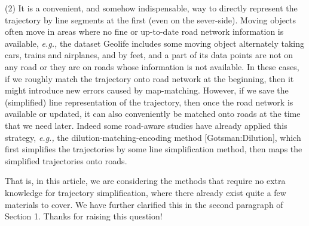 \documentclass{letter}
\newcommand{\eg}{\emph{e.g.,}\xspace}
\begin{document}
(2) It is a convenient, and somehow indispensable, way to directly represent the trajectory by line segments at the first (even on the sever-side). Moving objects often move in areas where no fine or up-to-date road network information is available, \eg the dataset Geolife includes some moving object alternately taking cars, trains and airplanes, and by feet, and a part of its data points are not on any road or they are on roads whose information is not available. In these cases, if we roughly match the trajectory onto road network at the beginning, then it might introduce new errors caused by map-matching. However, if we save the (simplified) line representation of the trajectory, then once the road network is available or updated, it can also conveniently be matched onto roads at the time that we need later. Indeed some road-aware studies have already applied this strategy, \eg the dilution-matching-encoding  method [Gotsman:Dilution], which first simplifies the trajectories by some line simplification method, then maps the simplified trajectories onto roads.


That is, in this article, we are considering the methods that require no extra knowledge for trajectory simplification, where there already exist quite a few materials to cover. We have further clarified this in the second paragraph of Section 1. Thanks for raising this question!

\end{document}
